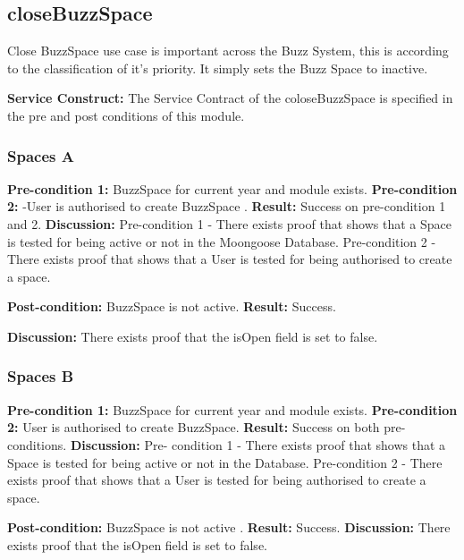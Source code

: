 
\newpage
\subsection{closeBuzzSpace}

Close BuzzSpace use case is important across the Buzz System, this is according to the classification of it's priority. It simply sets the Buzz Space to inactive. 

\textbf{Service Construct:}  The Service Contract of the coloseBuzzSpace is specified in the pre and post conditions of this module.	 
  				   \newline

\subsubsection{Spaces A}
\textbf{Pre-condition 1:}  BuzzSpace for current year and module exists.  \newline
\textbf{Pre-condition 2:}  -User is authorised to create BuzzSpace . \newline
\textbf{Result:}  Success on pre-condition 1 and 2.  \newline \newline
\textbf{Discussion:} Pre-condition 1 - There exists  proof that shows that a  Space is tested for being active or not in the Moongoose Database. Pre-condition 2 - There exists  proof that shows that a  User is tested for being authorised to create a space. \newline \newline

\textbf{Post-condition:}  BuzzSpace is not active.  \newline
\textbf{Result:}  Success. \newline \newline

\textbf{Discussion:} There exists  proof that the isOpen field is set to false.\newline

\subsubsection{Spaces B}
\textbf{Pre-condition 1:}  BuzzSpace for current year and module exists.  \newline
\textbf{Pre-condition 2:}  User is authorised to create BuzzSpace.  \newline
\textbf{Result:}  Success on both pre-conditions. \newline
\textbf{Discussion:} Pre- condition 1 -  There exists  proof that shows that a  Space is tested for being active or not in the Database. Pre-condition 2 -  There exists  proof that shows that a  User is tested for being authorised to create a space.\newline \newline 

\textbf{Post-condition:}  BuzzSpace is not active . \newline
\textbf{Result:}  Success. \newline
\textbf{Discussion:}  There exists  proof that the isOpen field is set to false. \newline

